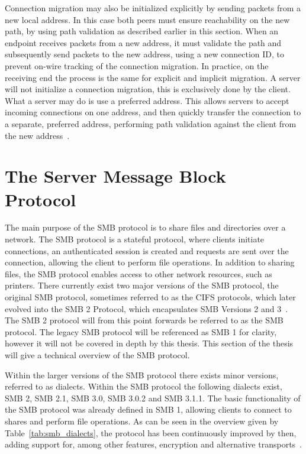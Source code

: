 \documentclass[english, 12pt, a4paper, elec, utf8, a-2b, online]{aaltothesis}
\begin{document}
Connection migration may also be initialized explicitly by sending packets from
a new local address. In this case both peers must ensure reachability on the
new path, by using path validation as described earlier in this section. When an endpoint
receives packets from a new address, it must validate the path and subsequently
send packets to the new address, using a new connection ID, to prevent on-wire
tracking of the connection migration. In practice, on the receiving end the process
is the same for explicit and implicit migration. A server will not initialize a 
connection migration, this is exclusively done by the client. What a server may
do is use a preferred address. This allows servers to accept incoming connections
on one address, and then quickly transfer the connection to a separate, preferred
address, performing path validation against the client from the new address~\cite{rfc9000}.

\clearpage

\section{The Server Message Block Protocol}
\label{sec:smb}

The main purpose of the SMB protocol is to share files and directories over a network.
The SMB protocol is a stateful protocol, where clients initiate connections,
an authenticated session is created and requests are sent over the connection, allowing
the client to perform file operations. In addition to sharing files, the SMB protocol enables
access to other network resources, such as printers. There currently exist
two major versions of the SMB protocol, the original SMB protocol, sometimes referred to as the CIFS protocols, which later
evolved into the SMB 2 Protocol, which encapsulates SMB Versions 2 and 3~\cite{smb2_tech}. The SMB 2
protocol will from this point forwards be referred to as the SMB protocol.
The legacy SMB protocol will be referenced as SMB 1 for clarity, however it will
not be covered in depth by this thesis. This section of the thesis will give a
technical overview of the SMB protocol.

Within the larger versions of the SMB protocol there exists minor versions, referred
to as dialects. Within the SMB protocol the following dialects exist, SMB 2,
SMB 2.1, SMB 3.0, SMB 3.0.2 and SMB 3.1.1. The basic functionality of the SMB protocol
was already defined in SMB 1, allowing clients to connect to shares and perform file
operations. As can be seen in the overview given by Table~\ref{tab:smb_dialects},
the protocol has been continuously improved by then, adding support for, among other
features, encryption and alternative transports~\cite{smb2_tech}.
\end{document}
